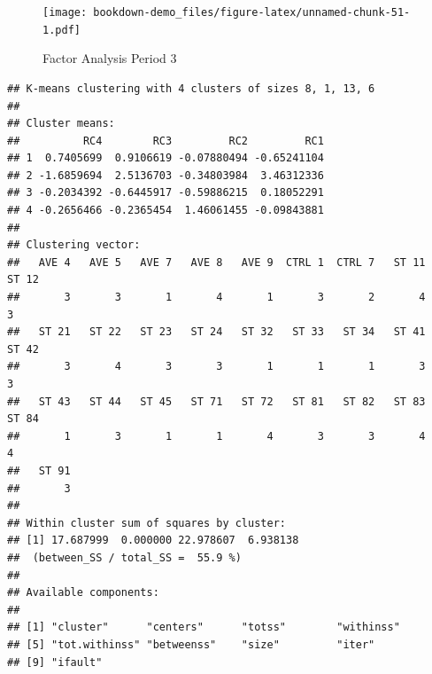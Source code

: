 \documentclass[]{book}
\newenvironment{Shaded}{\begin{snugshade}}{\end{snugshade}}
\newcommand{\KeywordTok}[1]{\textcolor[rgb]{0.13,0.29,0.53}{\textbf{#1}}}
\newcommand{\DataTypeTok}[1]{\textcolor[rgb]{0.13,0.29,0.53}{#1}}
\newcommand{\DecValTok}[1]{\textcolor[rgb]{0.00,0.00,0.81}{#1}}
\newcommand{\StringTok}[1]{\textcolor[rgb]{0.31,0.60,0.02}{#1}}
\newcommand{\OperatorTok}[1]{\textcolor[rgb]{0.81,0.36,0.00}{\textbf{#1}}}
\newcommand{\NormalTok}[1]{#1}
\begin{document}
\begin{Shaded}
\end{Shaded}

\begin{Shaded}
\end{Shaded}

\begin{figure}
\centering
\texttt{[image: bookdown-demo\_files/figure-latex/unnamed-chunk-51-1.pdf]}
\caption{\label{fig:unnamed-chunk-51}\label{fig:figs}Factor Analysis Period
3}
\end{figure}

\begin{verbatim}
## K-means clustering with 4 clusters of sizes 8, 1, 13, 6
## 
## Cluster means:
##          RC4        RC3         RC2         RC1
## 1  0.7405699  0.9106619 -0.07880494 -0.65241104
## 2 -1.6859694  2.5136703 -0.34803984  3.46312336
## 3 -0.2034392 -0.6445917 -0.59886215  0.18052291
## 4 -0.2656466 -0.2365454  1.46061455 -0.09843881
## 
## Clustering vector:
##   AVE 4   AVE 5   AVE 7   AVE 8   AVE 9  CTRL 1  CTRL 7   ST 11   ST 12 
##       3       3       1       4       1       3       2       4       3 
##   ST 21   ST 22   ST 23   ST 24   ST 32   ST 33   ST 34   ST 41   ST 42 
##       3       4       3       3       1       1       1       3       3 
##   ST 43   ST 44   ST 45   ST 71   ST 72   ST 81   ST 82   ST 83   ST 84 
##       1       3       1       1       4       3       3       4       4 
##   ST 91 
##       3 
## 
## Within cluster sum of squares by cluster:
## [1] 17.687999  0.000000 22.978607  6.938138
##  (between_SS / total_SS =  55.9 %)
## 
## Available components:
## 
## [1] "cluster"      "centers"      "totss"        "withinss"    
## [5] "tot.withinss" "betweenss"    "size"         "iter"        
## [9] "ifault"
\end{verbatim}
\end{document}
